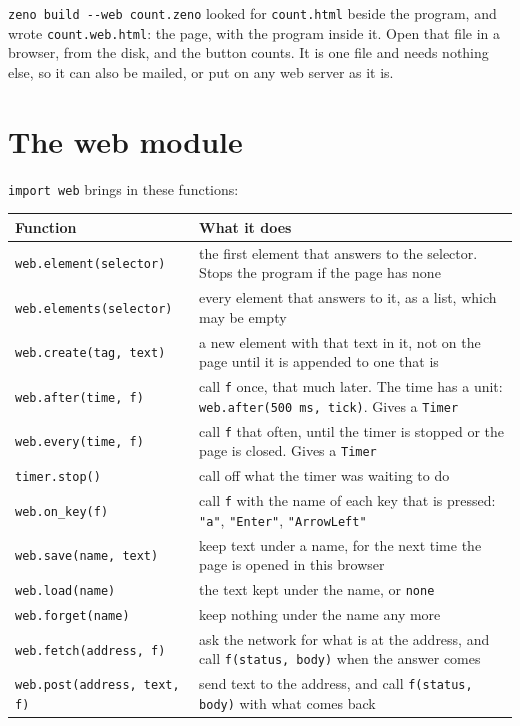 \verb|zeno build --web count.zeno| looked for \verb|count.html| beside
the program, and wrote \verb|count.web.html|: the page, with the
program inside it. Open that file in a browser, from the disk, and the
button counts. It is one file and needs nothing else, so it can also
be mailed, or put on any web server as it is.

\section{The web module}

\verb|import web| brings in these functions:

\begin{longtable}{lP{8.2cm}}
\toprule
Function & What it does \\
\midrule
\endhead
\verb|web.element(selector)| & the first element that answers to the
  selector. Stops the program if the page has none \\
\verb|web.elements(selector)| & every element that answers to it, as a
  list, which may be empty \\
\verb|web.create(tag, text)| & a new element with that text in it, not
  on the page until it is appended to one that is \\
\verb|web.after(time, f)| & call \verb|f| once, that much later. The
  time has a unit: \verb|web.after(500 ms, tick)|. Gives a \verb|Timer| \\
\verb|web.every(time, f)| & call \verb|f| that often, until the timer is
  stopped or the page is closed. Gives a \verb|Timer| \\
\verb|timer.stop()| & call off what the timer was waiting to do \\
\verb|web.on_key(f)| & call \verb|f| with the name of each key that is
  pressed: \verb|"a"|, \verb|"Enter"|, \verb|"ArrowLeft"| \\
\verb|web.save(name, text)| & keep text under a name, for the next time
  the page is opened in this browser \\
\verb|web.load(name)| & the text kept under the name, or \verb|none| \\
\verb|web.forget(name)| & keep nothing under the name any more \\
\verb|web.fetch(address, f)| & ask the network for what is at the
  address, and call \verb|f(status, body)| when the answer comes \\
\verb|web.post(address, text, f)| & send text to the address, and call
  \verb|f(status, body)| with what comes back \\
\bottomrule
\end{longtable}

